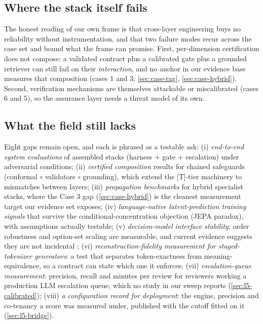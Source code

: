 \subsection{Where the stack itself fails}
The honest reading of our own frame is that cross-layer engineering buys no reliability without
instrumentation, and that two failure modes recur across the case set and bound what the frame can
promise. First, per-dimension
certification does not compose: a validated contract plus a calibrated gate plus a grounded
retriever can still fail on their \emph{interaction}, and no anchor in our evidence base
measures that composition (cases 1 and 3; \cref{sec:case-rag}, \cref{sec:case-hybrid}).
Second, verification mechanisms are themselves attackable or miscalibrated
\cite{id260601066,id260930217} (cases 6 and 5), so the assurance layer needs a threat model of
its own.

\subsection{What the field still lacks}
Eight gaps remain open, and each is phrased as a testable ask:
(i) \emph{end-to-end system evaluations} of assembled stacks (harness + gate + escalation)
under adversarial conditions;
(ii) \emph{certified composition} results for chained safeguards (conformal $\circ$ validators
$\circ$ grounding), which extend the [T]-tier machinery to mismatches between layers;
(iii) \emph{propagation benchmarks} for hybrid specialist stacks, where the Case 3 gap
(\cref{sec:case-hybrid}) is the cleanest measurement target our evidence set exposes;
(iv) \emph{language-native latent-prediction training signals} that survive the
conditional-concentration objection (JEPA paradox), with assumptions actually testable;
(v) \emph{decision-model interface stability}: order robustness and option-set scaling are
measurable, and current evidence suggests they are not incidental \cite{id261002267};
(vi) \emph{reconstruction-fidelity measurement for staged-tokenizer generators}: a test that
separates token-exactness from meaning-equivalence, so a contract can state which one it
enforces;
(vii) \emph{escalation-queue measurement}: precision, recall and minutes per review for
reviewers working a production LLM escalation queue, which no study in our sweep reports
(\cref{sec:l5-calibrated});
(viii) \emph{a configuration record for deployment}: the engine, precision and co-tenancy a
score was measured under, published with the cutoff fitted on it (\cref{sec:l5-bridge}).

